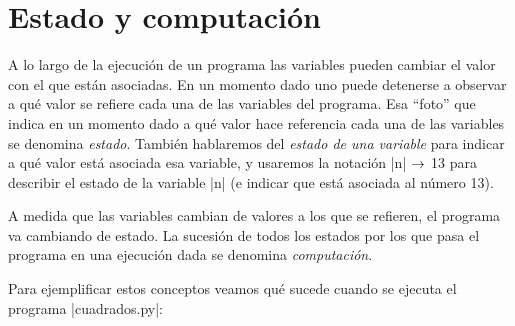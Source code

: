 \section{Estado y computación}

A lo largo de la ejecución de un programa las variables pueden
cambiar el valor con el que están asociadas. En un momento dado
uno puede detenerse a observar a qué valor se refiere cada una de
las variables del programa. Esa ``foto'' que indica en un momento dado
a qué valor hace referencia cada una de las variables se denomina
{\it estado}. También hablaremos del {\it estado de una variable}
para indicar a qué valor está asociada esa variable, y usaremos la
notación |n| $\rightarrow$ 13 para describir el estado de la variable |n| (e indicar
que está asociada al número 13).

A medida que las variables cambian de valores a los que se
refieren, el programa va cambiando de estado. La sucesión de todos
los estados por los que pasa el programa en una ejecución dada se
denomina {\it computación}.

Para ejemplificar estos conceptos veamos qué sucede cuando se
ejecuta el programa |cuadrados.py|:


